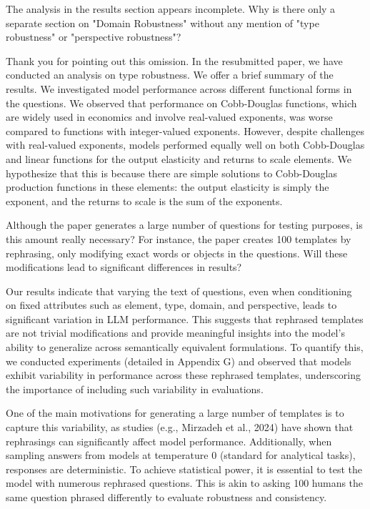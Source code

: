 \documentclass[12pt]{rebuttal_style}
\begin{document}
\begin{revcomment}
    The analysis in the results section appears incomplete. Why is there only a separate section on "Domain Robustness" without any mention of "type robustness" or "perspective robustness"?
\end{revcomment}
\begin{response}
    Thank you for pointing out this omission. In the resubmitted paper, we have conducted an analysis on type robustness. We offer a brief summary of the results. We investigated model performance across different functional forms in the questions. We observed that performance on Cobb-Douglas functions, which are widely used in economics and involve real-valued exponents, was worse compared to functions with integer-valued exponents. However, despite challenges with real-valued exponents, models performed equally well on both Cobb-Douglas and linear functions for the output elasticity and returns to scale elements. We hypothesize that this is because there are simple solutions to Cobb-Douglas production functions in these elements: the output elasticity is simply the exponent, and the returns to scale is the sum of the exponents.
\end{response}

\begin{revcomment}
    Although the paper generates a large number of questions for testing purposes, is this amount really necessary? For instance, the paper creates 100 templates by rephrasing, only modifying exact words or objects in the questions. Will these modifications lead to significant differences in results?
\end{revcomment}
\begin{response}
    Our results indicate that varying the text of questions, even when conditioning on fixed attributes such as element, type, domain, and perspective, leads to significant variation in LLM performance. This suggests that rephrased templates are not trivial modifications and provide meaningful insights into the model's ability to generalize across semantically equivalent formulations. To quantify this, we conducted experiments (detailed in Appendix G) and observed that models exhibit variability in performance across these rephrased templates, underscoring the importance of including such variability in evaluations.

    One of the main motivations for generating a large number of templates is to capture this variability, as studies (e.g., Mirzadeh et al., 2024) have shown that rephrasings can significantly affect model performance. Additionally, when sampling answers from models at temperature 0 (standard for analytical tasks), responses are deterministic. To achieve statistical power, it is essential to test the model with numerous rephrased questions. This is akin to asking 100 humans the same question phrased differently to evaluate robustness and consistency.
\end{response}
\end{document}
